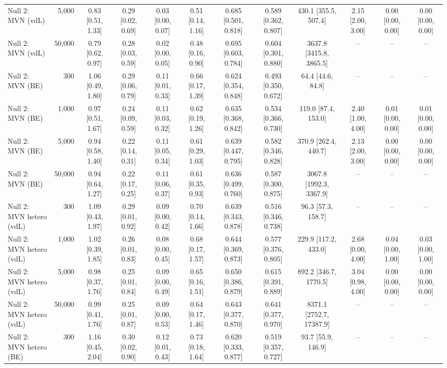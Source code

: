 \begin{table}[htbp]
{\begin{tabular}{lrcccccccccc}
Null 2: MVN (vdL) & 5,000 & 0.83 [0.51, 1.33] & 0.29 [0.02, 0.69] & 0.03 [0.00, 0.07] & 0.51 [0.14, 1.16] & 0.685 [0.501, 0.818] & 0.589 [0.362, 0.807] & 430.1 [355.5, 507.4] & 2.15 [2.00, 3.00] & 0.00 [0.00, 0.00] & 0.00 [0.00, 0.00] \\
Null 2: MVN (vdL) & 50,000 & 0.79 [0.62, 0.97] & 0.28 [0.03, 0.59] & 0.02 [0.00, 0.05] & 0.48 [0.16, 0.90] & 0.695 [0.603, 0.784] & 0.604 [0.301, 0.880] & 3637.8 [3415.8, 3865.5] & -- & -- & -- \\
Null 2: MVN (BE) & 300 & 1.06 [0.49, 1.80] & 0.29 [0.06, 0.79] & 0.11 [0.01, 0.33] & 0.66 [0.17, 1.39] & 0.624 [0.354, 0.848] & 0.493 [0.350, 0.672] & 64.4 [44.6, 84.8] & -- & -- & -- \\
Null 2: MVN (BE) & 1,000 & 0.97 [0.51, 1.67] & 0.24 [0.09, 0.59] & 0.11 [0.03, 0.32] & 0.62 [0.19, 1.26] & 0.635 [0.368, 0.842] & 0.534 [0.366, 0.730] & 119.0 [87.4, 153.0] & 2.40 [1.00, 4.00] & 0.01 [0.00, 0.00] & 0.01 [0.00, 0.00] \\
Null 2: MVN (BE) & 5,000 & 0.94 [0.58, 1.40] & 0.22 [0.14, 0.31] & 0.11 [0.05, 0.34] & 0.61 [0.29, 1.03] & 0.639 [0.447, 0.795] & 0.582 [0.346, 0.828] & 370.9 [262.4, 440.7] & 2.13 [2.00, 3.00] & 0.00 [0.00, 0.00] & 0.00 [0.00, 0.00] \\
Null 2: MVN (BE) & 50,000 & 0.94 [0.64, 1.27] & 0.22 [0.17, 0.25] & 0.11 [0.06, 0.37] & 0.61 [0.35, 0.93] & 0.636 [0.499, 0.760] & 0.587 [0.300, 0.875] & 3067.8 [1992.3, 3367.9] & -- & -- & -- \\
Null 2: MVN hetero (vdL) & 300 & 1.09 [0.43, 1.97] & 0.29 [0.01, 0.92] & 0.09 [0.00, 0.42] & 0.70 [0.14, 1.66] & 0.639 [0.343, 0.878] & 0.516 [0.346, 0.738] & 96.3 [57.3, 158.7] & -- & -- & -- \\
Null 2: MVN hetero (vdL) & 1,000 & 1.02 [0.39, 1.85] & 0.26 [0.01, 0.83] & 0.08 [0.00, 0.45] & 0.68 [0.17, 1.57] & 0.644 [0.369, 0.873] & 0.577 [0.376, 0.805] & 229.9 [117.2, 433.0] & 2.68 [0.00, 4.00] & 0.04 [0.00, 1.00] & 0.03 [0.00, 1.00] \\
Null 2: MVN hetero (vdL) & 5,000 & 0.98 [0.37, 1.76] & 0.25 [0.01, 0.84] & 0.09 [0.00, 0.49] & 0.65 [0.16, 1.51] & 0.650 [0.386, 0.879] & 0.615 [0.391, 0.889] & 892.2 [346.7, 1770.5] & 3.04 [0.98, 4.00] & 0.00 [0.00, 0.00] & 0.00 [0.00, 0.00] \\
Null 2: MVN hetero (vdL) & 50,000 & 0.99 [0.41, 1.76] & 0.25 [0.01, 0.87] & 0.09 [0.00, 0.53] & 0.64 [0.17, 1.46] & 0.643 [0.377, 0.870] & 0.641 [0.377, 0.970] & 8371.1 [2752.7, 17387.9] & -- & -- & -- \\
Null 2: MVN hetero (BE) & 300 & 1.16 [0.45, 2.04] & 0.30 [0.02, 0.90] & 0.12 [0.01, 0.43] & 0.73 [0.18, 1.64] & 0.620 [0.333, 0.877] & 0.519 [0.357, 0.727] & 93.7 [55.9, 146.9] & -- & -- & -- \\

\end{tabular}}
\end{table}
